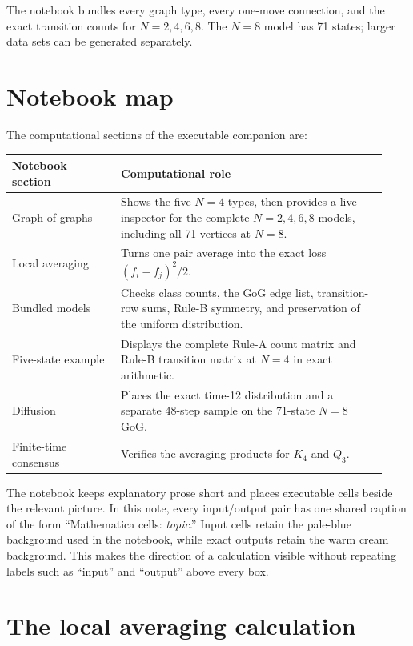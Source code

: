 \documentclass[11pt]{article}
\begin{document}
The notebook bundles every graph type, every one-move connection, and the
exact transition counts for $N=2,4,6,8$.  The $N=8$ model has 71 states;
larger data sets can be generated separately.

\section{Notebook map}

The computational sections of the executable companion are:

\begin{center}
\small
\begin{tabular}{@{}p{0.27\linewidth}p{0.66\linewidth}@{}}
\toprule
Notebook section & Computational role \\
\midrule
Graph of graphs & Shows the five $N=4$ types, then provides a live inspector
  for the complete $N=2,4,6,8$ models, including all 71 vertices at $N=8$. \\
Local averaging & Turns one pair average into the exact loss
  $(f_i-f_j)^2/2$. \\
Bundled models & Checks class counts, the GoG edge list, transition-row sums,
  Rule-B symmetry, and preservation of the uniform distribution. \\
Five-state example & Displays the complete Rule-A count matrix and Rule-B
  transition matrix at $N=4$ in exact arithmetic. \\
Diffusion & Places the exact time-12 distribution and a separate 48-step
  sample on the 71-state $N=8$ GoG. \\
Finite-time consensus & Verifies the averaging products for $K_4$ and $Q_3$.
  \\
\bottomrule
\end{tabular}
\end{center}

The notebook keeps explanatory prose short and places executable cells beside
the relevant picture.  In this note, every input/output pair has one shared
caption of the form ``Mathematica cells: \emph{topic}.''  Input cells retain
the pale-blue background used in the notebook, while exact outputs retain the
warm cream background.  This makes the direction of a calculation visible
without repeating labels such as ``input'' and ``output'' above every box.

\section{The local averaging calculation}
\end{document}
